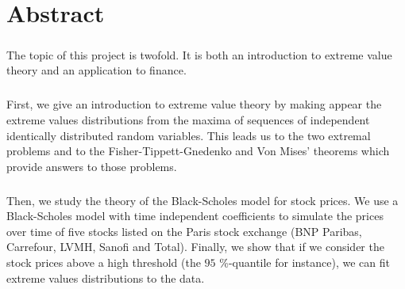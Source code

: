 

\cleardoublepage
\chapter*{Abstract}
\bigskip
\paragraph{}
The topic of this project is twofold. It is both an introduction to extreme value theory and an application to finance.
\paragraph{}
First, we give an introduction to extreme value theory by making appear the extreme values distributions from the maxima of sequences of independent identically distributed random variables. This leads us to the two extremal problems and to the Fisher-Tippett-Gnedenko and Von Mises' theorems which provide answers to those problems.
\paragraph{}
Then, we study the theory of the Black-Scholes model for stock prices. We use a Black-Scholes model with time independent coefficients to simulate the prices over time of five stocks listed on the Paris stock exchange (BNP Paribas, Carrefour, LVMH, Sanofi and Total). Finally, we show that if we consider the stock prices above a high threshold (the $95$ \%-quantile for instance), we can fit extreme values distributions to the data.
\vskip0.5cm


